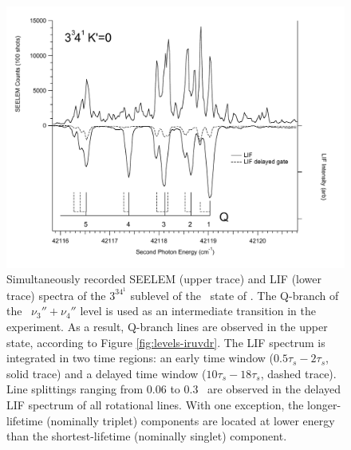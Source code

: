 \documentclass[12pt]{mitthesis}
\begin{document}
\begin{figure}
  \caption{Simultaneously recorded SEELEM (upper trace) and LIF (lower
    trace) spectra of the $3^34^1$  sublevel of the \astate\
    state of .  The Q-branch of the \xstate\ $\nu_3'' +
    \nu_4''$ level is used as an intermediate transition in the
    experiment.  As a result, Q-branch lines are observed in the upper
    state, according to Figure \ref{fig:levels-iruvdr}.  The LIF
    spectrum is integrated in two time regions: an early time window
    ($0.5\tau_s-2\tau_s$, solid trace) and a delayed time window
    ($10\tau_s-18\tau_s$, dashed trace).  Line splittings ranging from
    0.06 to 0.3 \rcm\ are observed in the delayed LIF spectrum of all
    rotational lines.  With one exception, the longer-lifetime
    (nominally triplet) components are located at lower energy than
    the shortest-lifetime (nominally singlet) component.}
  \label{fig:survey-3341}
  \centering
  \includegraphics[width=7in,angle=90]{spectrum-3341-q5q1-primed.pdf}
\end{figure}
\end{document}
